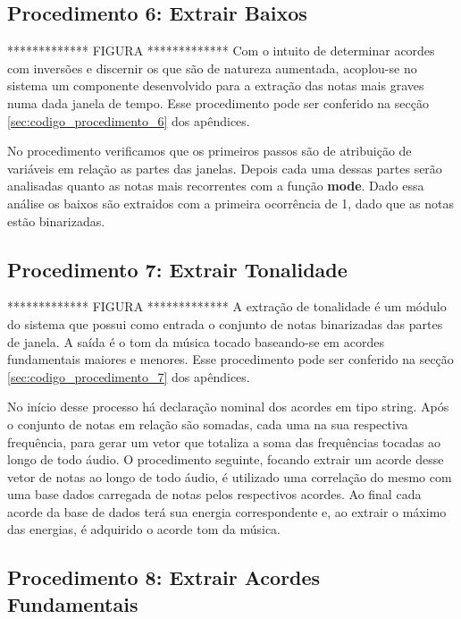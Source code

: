 \subsection{Procedimento 6: Extrair Baixos}
\label{subsec:procedimento_6}

************* FIGURA *************
Com o intuito de determinar acordes com inversões e discernir os que são de natureza aumentada, acoplou-se no sistema um componente desenvolvido para a extração das notas mais graves numa dada janela de tempo. Esse procedimento pode ser conferido na secção \ref{sec:codigo_procedimento_6} dos apêndices. 

No procedimento verificamos que os primeiros passos são de atribuição de variáveis em relação as partes das janelas. Depois cada uma dessas partes serão analisadas quanto as notas mais recorrentes com a função \textbf{mode}. Dado essa análise os baixos são extraidos com a primeira ocorrência de 1, dado que as notas estão binarizadas.

\subsection{Procedimento 7: Extrair Tonalidade}
\label{subsec:procedimento_7}

************* FIGURA *************
A extração de tonalidade é um módulo do sistema que possui como entrada o conjunto de notas binarizadas das partes de janela. A saída é o tom da música tocado baseando-se em acordes fundamentais maiores e menores. Esse procedimento pode ser conferido na secção \ref{sec:codigo_procedimento_7} dos apêndices. 

No início desse processo há declaração nominal dos acordes em tipo string. Após o conjunto de notas em relação são somadas, cada uma na sua respectiva frequência, para gerar um vetor que totaliza a soma das frequências tocadas ao longo de todo áudio. O procedimento seguinte, focando extrair um acorde desse vetor de notas ao longo de todo áudio, é utilizado uma correlação do mesmo com uma base dados carregada de notas pelos respectivos acordes. Ao final cada acorde da base de dados terá sua energia correspondente e, ao extrair o máximo das energias, é adquirido o acorde tom da música.

\subsection{Procedimento 8: Extrair Acordes Fundamentais}
\label{subsec:procedimento_8}

